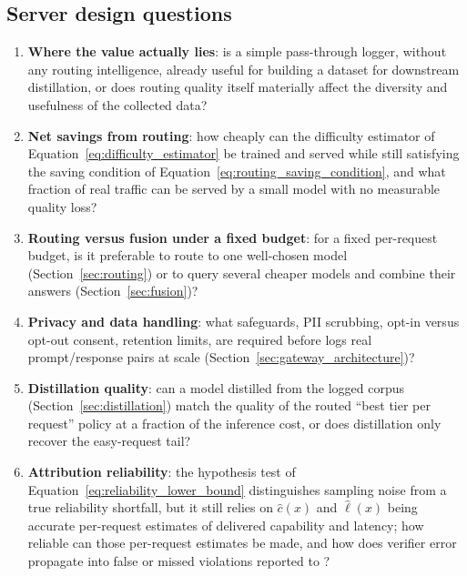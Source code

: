 \subsection{Server design questions}
\label{sec:open_questions_server}

\begin{enumerate}
  \item \textbf{Where the value actually lies}: is a simple pass-through
    logger, without any routing intelligence, already useful for building
    a dataset for downstream distillation, or does routing quality itself
    materially affect the diversity and usefulness of the collected data?

  \item \textbf{Net savings from routing}: how cheaply can the difficulty
    estimator of Equation~\eqref{eq:difficulty_estimator} be trained and
    served while still satisfying the saving condition of
    Equation~\eqref{eq:routing_saving_condition}, and what fraction of
    real traffic can be served by a small model with no measurable
    quality loss?

  \item \textbf{Routing versus fusion under a fixed budget}: for a fixed
    per-request budget, is it preferable to route to one well-chosen
    model (Section~\ref{sec:routing}) or to query several cheaper models
    and combine their answers (Section~\ref{sec:fusion})?

  \item \textbf{Privacy and data handling}: what safeguards, PII
    scrubbing, opt-in versus opt-out consent, retention limits, are
    required before \NoesisServer{} logs real prompt/response pairs at
    scale (Section~\ref{sec:gateway_architecture})?

  \item \textbf{Distillation quality}: can a model distilled from the
    logged corpus (Section~\ref{sec:distillation}) match the quality of
    the routed ``best tier per request'' policy at a fraction of the
    inference cost, or does distillation only recover the easy-request
    tail?

  \item \textbf{Attribution reliability}: the hypothesis test of
    Equation~\eqref{eq:reliability_lower_bound} distinguishes sampling
    noise from a true reliability shortfall, but it still relies on
    $\hat c(x)$ and $\hat\ell(x)$ being accurate per-request estimates of
    delivered capability and latency; how reliable can those per-request
    estimates be made, and how does verifier error propagate into false
    or missed violations reported to \NoesisMarket?
\end{enumerate}

